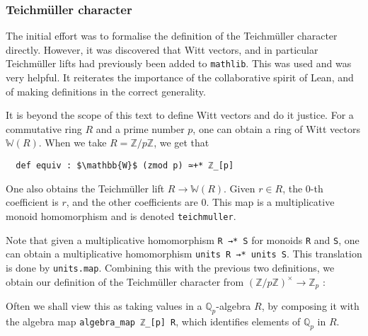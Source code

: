 \documentclass[a4paper,UKenglish,cleveref, autoref, thm-restate]{lipics-v2021}
\newcommand{\lean}[1]{\texttt{#1}\xspace} %
\begin{document}
\subsubsection{Teichmüller character}
The initial effort was to formalise the definition of the Teichmüller character directly. 
However, it was discovered that Witt vectors, and in particular Teichmüller lifts had previously 
been added to \lean{mathlib}. This was used and was very helpful. It reiterates the importance 
of the collaborative spirit of Lean, and of making definitions in the correct generality. 

It is beyond the scope of this text to define Witt vectors and do it justice. For a commutative ring
$R$ and a prime number $p$, one can obtain a ring of Witt vectors $\mathbb{W}(R)$.
When we take $R = \mathbb{Z}/p \mathbb{Z}$, we get that

\begin{lstlisting}
  def equiv : $\mathbb{W}$ (zmod p) ≃+* ℤ_[p]
\end{lstlisting}

One also obtains the Teichmüller lift $R \to \mathbb{W} (R)$. Given $r \in R$, 
the 0-th coefficient is $r$, and the other coefficients are 0. This map is a 
multiplicative monoid homomorphism and is denoted \lean{teichmuller}. 

Note that given a multiplicative homomorphism \lean{R →* S} for monoids \lean{R} 
and \lean{S}, one can obtain a multiplicative homomorphism \lean{units R →* units S}. 
This translation is done by \lean{units.map}. Combining this with the previous two 
definitions, we obtain our definition of the Teichmüller character from 
$(\mathbb{Z}/p \mathbb{Z})^{\times} \to \mathbb{Z}_p$ : 

Often we shall view this as taking values in a $\mathbb{Q}_p$-algebra $R$, by composing it 
with the algebra map \lean{algebra\_map ℤ\_[p] R}, which identifies elements of $\mathbb{Q}_p$ 
in $R$. 
\end{document}

